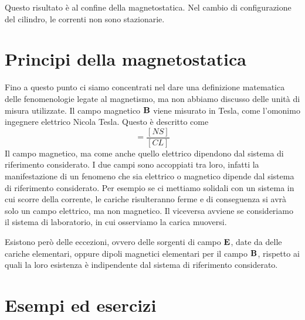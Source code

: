 \begin{remark}
Questo risultato \`e al confine della magnetostatica. Nel cambio di configurazione del cilindro, le correnti non sono stazionarie.	
\end{remark}


\section{Principi della magnetostatica}

Fino a questo punto ci siamo concentrati nel dare una definizione matematica delle fenomenologie legate al magnetismo, ma non abbiamo discusso delle unit\`a di misura utilizzate. Il campo magnetico $\bold{B}$ viene misurato in Tesla, come l'omonimo ingegnere elettrico Nicola Tesla. Questo \`e descritto come
\begin{equation*}
	[T] = \frac{[N S]}{[CL]}
\end{equation*}
Il campo magnetico, ma come anche quello elettrico dipendono dal sistema di riferimento considerato. I due campi sono accoppiati tra loro, infatti la manifestazione di un fenomeno che sia elettrico o magnetico dipende dal sistema di riferimento considerato. Per esempio se ci mettiamo solidali con un sistema in cui scorre della corrente, le cariche risulteranno ferme e di conseguenza si avr\`a solo un campo elettrico, ma non magnetico. Il viceversa avviene se consideriamo il sistema di laboratorio, in cui osserviamo la carica muoversi.
\newline

Esistono per\`o delle eccezioni, ovvero delle sorgenti di campo $\bold{E}$, date da delle cariche elementari, oppure dipoli magnetici elementari per il campo $\bold{B}$, rispetto 
	ai quali la loro esistenza \`e indipendente dal sistema di riferimento considerato.
	
\section{Esempi ed esercizi}

